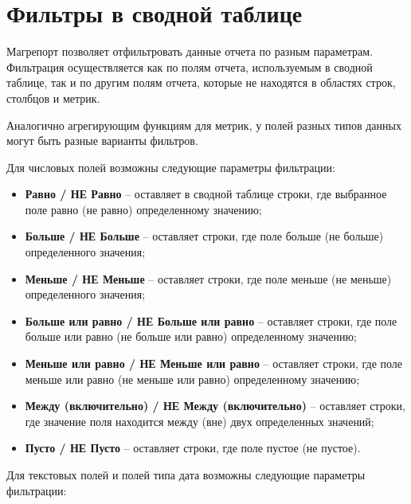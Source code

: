 \documentclass[../user-manual.tex]{subfiles}
\begin{document}
	\section{Фильтры в сводной таблице}
	
	Магрепорт позволяет отфильтровать данные отчета по разным параметрам. Фильтрация осуществляется как по полям отчета, используемым в сводной таблице, так и по другим полям отчета, которые не находятся в областях строк, столбцов и метрик. 
	
	Аналогично агрегирующим функциям для метрик, у полей разных типов данных могут быть разные варианты фильтров.

	Для числовых полей возможны следующие параметры фильтрации:
	
	\begin{itemize}
		
		\item \textbf{Равно / НЕ Равно} -- оставляет в сводной таблице строки, где выбранное поле равно (не равно) определенному значению;
		
		\item \textbf{Больше / НЕ Больше} -- оставляет строки, где поле больше (не больше) определенного значения;
		
		\item \textbf{Меньше / НЕ Меньше} -- оставляет строки, где поле меньше (не меньше) определенного значения;
		
		\item \textbf{Больше или равно / НЕ Больше или равно} -- оставляет строки, где поле больше или равно (не больше или равно) определенному значению;
		
		\item \textbf{Меньше или равно / НЕ Меньше или равно} -- оставляет строки, где поле меньше или равно (не меньше или равно) определенному значению;
		
		\item \textbf{Между (включительно) / НЕ Между (включительно)} -- оставляет строки, где значение поля находится между (вне) двух определенных значений;
		
		\item \textbf{Пусто / НЕ Пусто} -- оставляет строки, где поле пустое (не пустое).
		
	\end{itemize}
	
	Для текстовых полей и полей типа дата возможны следующие параметры фильтрации:
	
\end{document}
